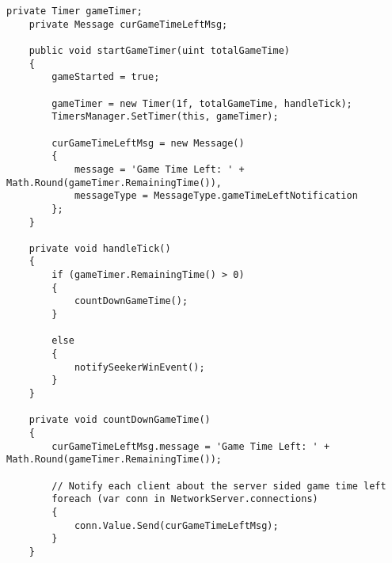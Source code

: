 \begin{lstlisting}[caption= InGameProgressManager.cs global Game Time Handling]
	private Timer gameTimer;
	private Message curGameTimeLeftMsg;
	
	public void startGameTimer(uint totalGameTime)
	{
		gameStarted = true;
		
		gameTimer = new Timer(1f, totalGameTime, handleTick);
		TimersManager.SetTimer(this, gameTimer);
		
		curGameTimeLeftMsg = new Message()
		{
			message = 'Game Time Left: ' + Math.Round(gameTimer.RemainingTime()),
			messageType = MessageType.gameTimeLeftNotification
		};
	}
	
	private void handleTick()
	{
		if (gameTimer.RemainingTime() > 0)
		{
			countDownGameTime();
		}
		
		else
		{
			notifySeekerWinEvent();
		}
	}
	
	private void countDownGameTime()
	{
		curGameTimeLeftMsg.message = 'Game Time Left: ' + Math.Round(gameTimer.RemainingTime());
		
		// Notify each client about the server sided game time left
		foreach (var conn in NetworkServer.connections)
		{
			conn.Value.Send(curGameTimeLeftMsg);
		}
	}
\end{lstlisting}
